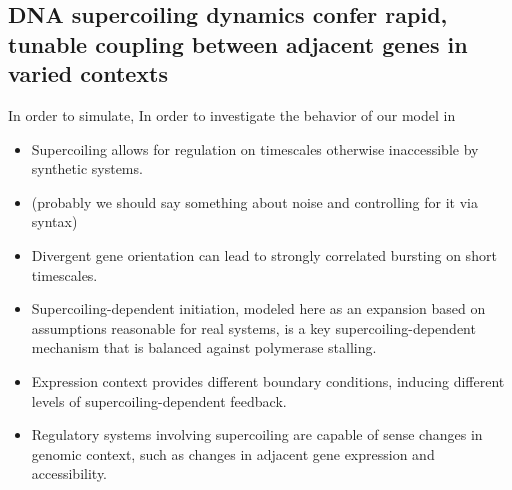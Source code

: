 \documentclass[11pt]{article}
\begin{document}
\subsection{ DNA supercoiling dynamics confer rapid, tunable coupling between adjacent genes in varied contexts}
In order to simulate,
In order to investigate the behavior of our model in
\begin{itemize}
    \item Supercoiling allows for regulation on timescales otherwise inaccessible by synthetic systems.

    \item (probably we should say something about noise and controlling for it via syntax)

    \item Divergent gene orientation can lead to strongly correlated bursting on short timescales.

    \item Supercoiling-dependent initiation, modeled here as an expansion based on assumptions reasonable for real systems, is a key supercoiling-dependent mechanism that is balanced against polymerase stalling.

    \item Expression context provides different boundary conditions, inducing different levels of supercoiling-dependent feedback.

    \item Regulatory systems involving supercoiling are capable of sense changes in genomic context, such as changes in adjacent gene expression and accessibility.
\end{itemize}
\end{document}
